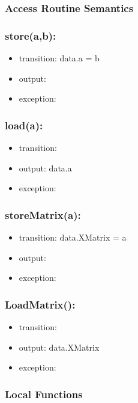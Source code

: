 \documentclass[12pt, titlepage]{article}
\begin{document}
\subsubsection{Access Routine Semantics}

\subsubsection*{store(a,b):}
\begin{itemize}
\item transition: data.a = b 
\item output: 
\item exception:  
\end{itemize}


\subsubsection*{load(a):}
\begin{itemize}
	\item transition:  
	\item output: data.a
	\item exception:  
\end{itemize}


\subsubsection*{storeMatrix(a):}
\begin{itemize}
	\item transition: data.XMatrix = a 
	\item output: 
	\item exception:  
\end{itemize}

\subsubsection*{LoadMatrix():}
\begin{itemize}
	\item transition:  
	\item output: data.XMatrix
	\item exception:  
\end{itemize}



\subsubsection{Local Functions}
\end{document}
